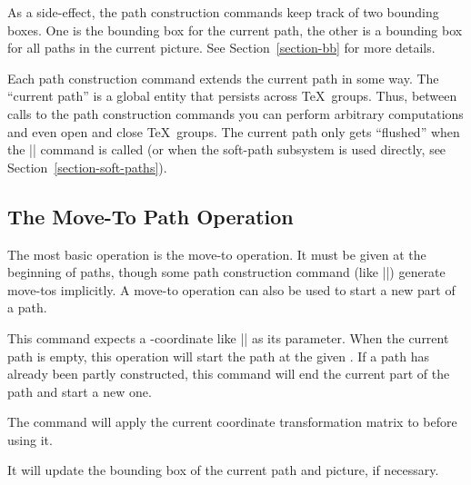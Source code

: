 As a side-effect, the path construction commands keep track of two
bounding boxes. One is the bounding box for the current path, the
other is a bounding box for all paths in the current picture. See
Section~\ref{section-bb} for more details.

Each path construction command extends the current path in some
way. The ``current path'' is a global entity that persists across
\TeX\ groups. Thus, between calls to the path construction commands
you can perform arbitrary computations and even open and close \TeX\
groups. The current path only gets ``flushed'' when the |\pgfusepath|
command is called (or when the soft-path subsystem is used directly,
see Section~\ref{section-soft-paths}).

\subsection{The Move-To Path Operation}

The most basic operation is the move-to operation. It must be given at
the beginning of paths, though some path construction command (like
|\pgfpathrectangle|) generate move-tos implicitly. A move-to operation
can also be used to start a new part of a path.

\begin{command}{\pgfpathmoveto{}}
  This command expects a \pgfname-coordinate like |\pgfpointorigin| as
  its parameter. When the current path is empty, this operation will
  start the path at the given \meta{coordinate}. If a path has already
  been partly constructed, this command will end the current part of
  the path and start a new one.
\begin{codeexample}[]
\begin{pgfpicture}
  \pgfpathmoveto{\pgfpointorigin}
  \pgfpathlineto{\pgfpoint{1cm}{1cm}}
  \pgfpathlineto{\pgfpoint{2cm}{1cm}}
  \pgfpathlineto{\pgfpoint{3cm}{0.5cm}}
  \pgfpathlineto{\pgfpoint{3cm}{0cm}}
\end{pgfpicture}
\end{codeexample}
\begin{codeexample}[]
\begin{pgfpicture}
  \pgfpathmoveto{\pgfpointorigin}
  \pgfpathlineto{\pgfpoint{1cm}{1cm}}
  \pgfpathlineto{\pgfpoint{2cm}{1cm}}
  \pgfpathmoveto{\pgfpoint{2cm}{1cm}} %
  \pgfpathlineto{\pgfpoint{3cm}{0.5cm}}
  \pgfpathlineto{\pgfpoint{3cm}{0cm}}
\end{pgfpicture}
\end{codeexample}
  The command will apply the current coordinate transformation matrix
  to \meta{coordinate} before using it.

  It will update the bounding box of the current path and
  picture, if necessary.
\end{command}


